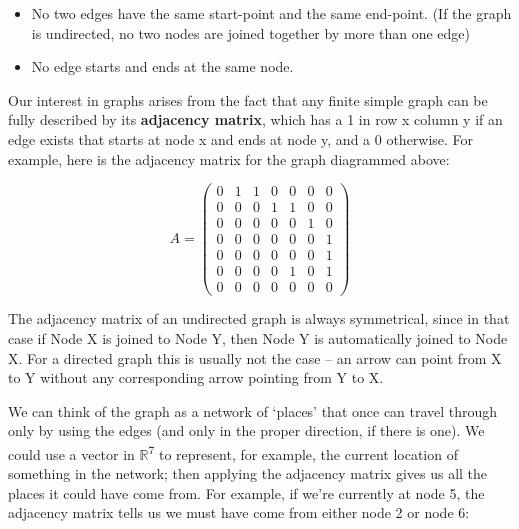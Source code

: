 \documentclass[oneside,english]{amsbook}
\numberwithin{section}{chapter}
\theoremstyle{plain}
\theoremstyle{definition}
\begin{document}
\begin{itemize}
	\item
	No two edges have the same start-point and the same end-point. (If the
	graph is undirected, no two nodes are joined together by more than one
	edge)
	\item
	No edge starts and ends at the same node.
\end{itemize}

Our interest in graphs arises from the fact that any finite simple graph
can be fully described by its \textbf{adjacency matrix}, which has a 1
in row x column y if an edge exists that starts at node x and ends at
node y, and a 0 otherwise. For example, here is the adjacency matrix for
the graph diagrammed above:

\[A = \begin{pmatrix}
	0 & 1 & 1 & 0 & 0 & 0 & 0 \\
	0 & 0 & 0 & 1 & 1 & 0 & 0 \\
	0 & 0 & 0 & 0 & 0 & 1 & 0 \\
	0 & 0 & 0 & 0 & 0 & 0 & 1 \\
	0 & 0 & 0 & 0 & 0 & 0 & 1 \\
	0 & 0 & 0 & 0 & 1 & 0 & 1 \\
	0 & 0 & 0 & 0 & 0 & 0 & 0
\end{pmatrix}\]

The adjacency matrix of an undirected graph is always symmetrical, since
in that case if Node X is joined to Node Y, then Node Y is automatically
joined to Node X. For a directed graph this is usually not the case --
an arrow can point from X to Y without any corresponding arrow pointing
from Y to X.

We can think of the graph as a network of `places' that once can
travel through only by using the edges (and only in the proper
direction, if there is one). We could use a vector in
$\mathbb{R}$\textsuperscript{7} to represent, for example, the current
location of something in the network; then applying the adjacency matrix
gives us all the places it could have come from. For example, if we're
currently at node 5, the adjacency matrix tells us we must have come
from either node 2 or node 6:
\end{document}
